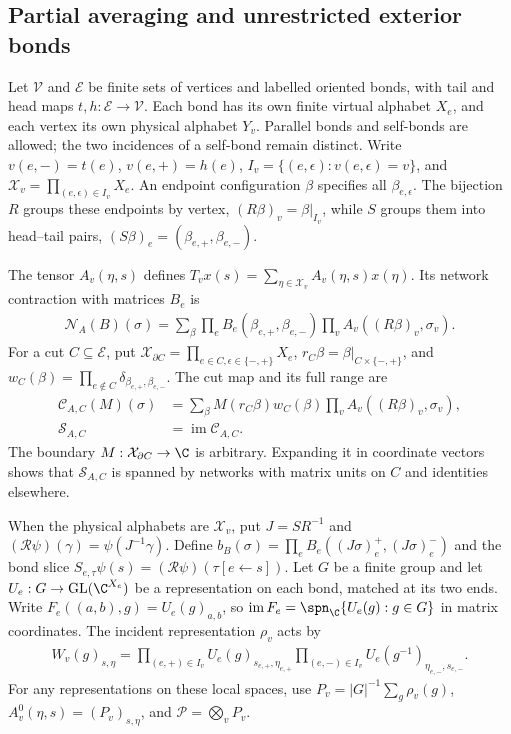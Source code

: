 \subsection{Partial averaging and unrestricted exterior bonds}
\label{sec:peps_dependent_open_support}

Let $\mathcal V$ and $\mathcal E$ be finite sets of vertices and labelled
oriented bonds, with tail and head maps $t,h:\mathcal E\to\mathcal V$.
Each bond has its own finite virtual alphabet $X_e$, and each vertex its
own physical alphabet $Y_v$. Parallel bonds and self-bonds are allowed;
the two incidences of a self-bond remain distinct. Write
$v(e,-)=t(e)$, $v(e,+)=h(e)$,
$I_v=\{(e,\epsilon):v(e,\epsilon)=v\}$, and
$\mathcal X_v=\prod_{(e,\epsilon)\in I_v}X_e$.
An endpoint configuration $\beta$ specifies all $\beta_{e,\epsilon}$.
The bijection $R$ groups these endpoints by vertex,
$(R\beta)_v=\beta|_{I_v}$, while $S$ groups them into head--tail pairs,
$(S\beta)_e=(\beta_{e,+},\beta_{e,-})$.

The tensor $A_v(\eta,s)$ defines
$T_vx(s)=\sum_{\eta\in\mathcal X_v}A_v(\eta,s)x(\eta)$.
Its network contraction with matrices $B_e$ is
\begin{align}
    \mathcal N_A(B)(\sigma)
    =\sum_\beta\prod_e B_e(\beta_{e,+},\beta_{e,-})
    \prod_v A_v((R\beta)_v,\sigma_v).
    \label{eq:peps_open_network_notation}
\end{align}
For a cut $C\subseteq\mathcal E$, put
$\mathcal X_{\partial C}=\prod_{e\in C,\epsilon\in\{-,+\}}X_e$,
$r_C\beta=\beta|_{C\times\{-,+\}}$, and
$w_C(\beta)=\prod_{e\notin C}\delta_{\beta_{e,+},\beta_{e,-}}$.
The cut map and its full range are
\begin{align}
    \mathcal C_{A,C}(M)(\sigma)
                     & =\sum_\beta M(r_C\beta)w_C(\beta)
    \prod_v A_v((R\beta)_v,\sigma_v),
    \label{eq:peps_open_cut_notation}                      \\
    \mathcal S_{A,C} & =\operatorname{im}\mathcal C_{A,C}.
    \nonumber
\end{align}
The boundary $M:\mathcal X_{\partial C}\to\C$ is arbitrary.
Expanding it in coordinate vectors shows that $\mathcal S_{A,C}$ is
spanned by networks with matrix units on $C$ and identities elsewhere.

When the physical alphabets are $\mathcal X_v$, put $J=SR^{-1}$ and
$(\mathcal R\psi)(\gamma)=\psi(J^{-1}\gamma)$. Define
$b_B(\sigma)=\prod_eB_e((J\sigma)_e^+,(J\sigma)_e^-)$ and the bond slice
$S_{e,\tau}\psi(s)=(\mathcal R\psi)(\tau[e\leftarrow s])$.
Let $G$ be a finite group and let
$U_e:G\to\operatorname{GL}(\C^{X_e})$ be a representation on each bond,
matched at its two ends. Write
$F_e((a,b),g)=U_e(g)_{a,b}$, so
$\operatorname{im}F_e=\spn_{\C}\{U_e(g):g\in G\}$ in matrix coordinates.
The incident representation $\rho_v$ acts by
\begin{align}
    W_v(g)_{s,\eta}
    =\prod_{(e,+)\in I_v}U_e(g)_{s_{e,+},\eta_{e,+}}
    \prod_{(e,-)\in I_v}U_e(g^{-1})_{\eta_{e,-},s_{e,-}}.
    \label{eq:peps_open_incident_notation}
\end{align}
For any representations on these local spaces, use
$P_v=|G|^{-1}\sum_g\rho_v(g)$, $A_v^0(\eta,s)=(P_v)_{s,\eta}$,
and $\mathcal P=\bigotimes_vP_v$.


